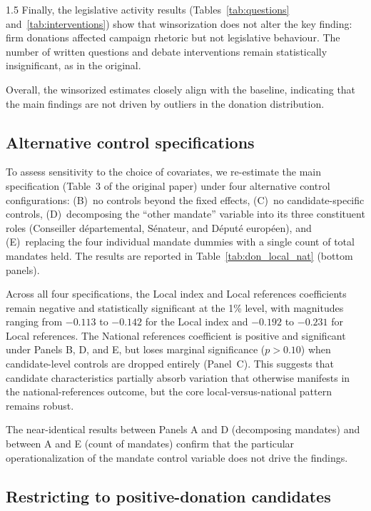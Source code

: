 \documentclass[12pt,a4paper]{article}
\begin{document}
\begin{spacing}{1.5}
Finally, the legislative activity results (Tables~\ref{tab:questions} and~\ref{tab:interventions}) show that winsorization does not alter the key finding: firm donations affected campaign rhetoric but not legislative behaviour. The number of written questions and debate interventions remain statistically insignificant, as in the original.

Overall, the winsorized estimates closely align with the baseline, indicating that the main findings are not driven by outliers in the donation distribution.


\subsection{Alternative control specifications}

To assess sensitivity to the choice of covariates, we re-estimate the main specification (Table~3 of the original paper) under four alternative control configurations: (B)~no controls beyond the fixed effects, (C)~no candidate-specific controls, (D)~decomposing the ``other mandate'' variable into its three constituent roles (Conseiller d\'{e}partemental, S\'{e}nateur, and D\'{e}put\'{e} europ\'{e}en), and (E)~replacing the four individual mandate dummies with a single count of total mandates held. The results are reported in Table~\ref{tab:don_local_nat} (bottom panels).

Across all four specifications, the Local index and Local references coefficients remain negative and statistically significant at the 1\% level, with magnitudes ranging from $-0.113$ to $-0.142$ for the Local index and $-0.192$ to $-0.231$ for Local references. The National references coefficient is positive and significant under Panels B, D, and E, but loses marginal significance ($p>0.10$) when candidate-level controls are dropped entirely (Panel~C). This suggests that candidate characteristics partially absorb variation that otherwise manifests in the national-references outcome, but the core local-versus-national pattern remains robust.

The near-identical results between Panels A and D (decomposing mandates) and between A and E (count of mandates) confirm that the particular operationalization of the mandate control variable does not drive the findings.


\subsection{Restricting to positive-donation candidates}


\end{spacing}
\end{document}
